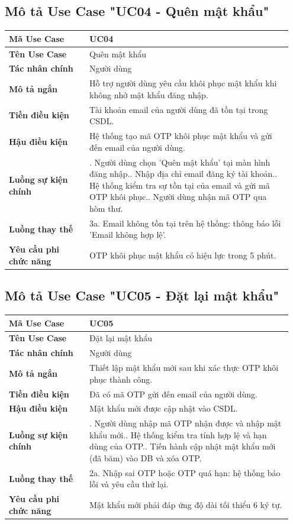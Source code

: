 \documentclass[a4paper,oneside]{report}
\begin{document}
\subsection{Mô tả Use Case "UC04 - Quên mật khẩu"}

\begin{longtable}[]{@{}>{\RaggedRight\arraybackslash}p{0.27\linewidth}>{\RaggedRight\arraybackslash}p{0.68\linewidth}@{}}
\toprule
\textbf{Mã Use Case} & UC04\tabularnewline
\midrule
\endhead
\textbf{Tên Use Case} & Quên mật khẩu\tabularnewline
\textbf{Tác nhân chính} & Người dùng\tabularnewline
\textbf{Mô tả ngắn} & Hỗ trợ người dùng yêu cầu khôi phục mật khẩu khi
không nhớ mật khẩu đăng nhập.\tabularnewline
\textbf{Tiền điều kiện} & Tài khoản email của người dùng đã tồn tại
trong CSDL.\tabularnewline
\textbf{Hậu điều kiện} & Hệ thống tạo mã OTP khôi phục mật khẩu và gửi
đến email của người dùng.\tabularnewline
\textbf{Luồng sự kiện chính} & 1. Người dùng chọn
'Quên mật khẩu' tại màn hình đăng nhập.\newline 2. Nhập địa chỉ
email đăng ký tài khoản.\newline 3. Hệ thống kiểm tra sự tồn tại
của email và gửi mã OTP khôi phục.\newline 4. Người dùng nhận mã
OTP qua hòm thư.\tabularnewline
\textbf{Luồng thay thế} & 3a. Email không tồn tại trên hệ thống: thông
báo lỗi 'Email không hợp lệ'.\tabularnewline
\textbf{Yêu cầu phi chức năng} & OTP khôi phục mật khẩu có hiệu lực
trong 5 phút.\tabularnewline
\bottomrule
\end{longtable}

\subsection{Mô tả Use Case "UC05 - Đặt lại mật khẩu"}

\begin{longtable}[]{@{}>{\RaggedRight\arraybackslash}p{0.27\linewidth}>{\RaggedRight\arraybackslash}p{0.68\linewidth}@{}}
\toprule
\textbf{Mã Use Case} & UC05\tabularnewline
\midrule
\endhead
\textbf{Tên Use Case} & Đặt lại mật khẩu\tabularnewline
\textbf{Tác nhân chính} & Người dùng\tabularnewline
\textbf{Mô tả ngắn} & Thiết lập mật khẩu mới sau khi xác thực OTP khôi
phục thành công.\tabularnewline
\textbf{Tiền điều kiện} & Đã có mã OTP gửi đến email của người
dùng.\tabularnewline
\textbf{Hậu điều kiện} & Mật khẩu mới được cập nhật vào
CSDL.\tabularnewline
\textbf{Luồng sự kiện chính} & 1. Người dùng nhập mã
OTP nhận được và nhập mật khẩu mới.\newline 2. Hệ thống kiểm tra
tính hợp lệ và hạn dùng của OTP.\newline 3. Tiến hành cập nhật mật
khẩu mới (đã băm) vào DB và xóa OTP.\tabularnewline
\textbf{Luồng thay thế} & 2a. Nhập sai OTP hoặc OTP quá hạn: hệ thống
báo lỗi và yêu cầu thử lại.\tabularnewline
\textbf{Yêu cầu phi chức năng} & Mật khẩu mới phải đáp ứng độ dài tối
thiểu 6 ký tự.\tabularnewline
\bottomrule
\end{longtable}
\end{document}
